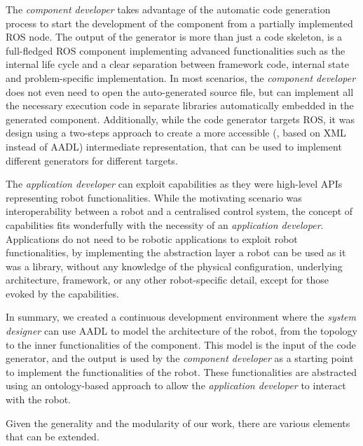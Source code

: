 The \textit{component developer} takes advantage of the automatic code generation process to start the development of the component from a partially implemented ROS node. The output of the generator is more than just a code skeleton, is a full-fledged ROS component implementing advanced functionalities such as the internal life cycle and a clear separation between framework code, internal state and problem-specific implementation. In most scenarios, the \textit{component developer} does not even need to open the auto-generated source file, but can implement all the necessary execution code in separate libraries automatically embedded in the generated component. Additionally, while the code generator targets ROS, it was design using a two-steps approach to create a more accessible (\ie, based on XML instead of AADL) intermediate representation, that can be used to implement different generators for different targets.

The \textit{application developer} can exploit capabilities as they were high-level APIs representing robot functionalities. While the motivating scenario was interoperability between a robot and a centralised control system, the concept of capabilities fits wonderfully with the necessity of an \textit{application developer}. Applications do not need to be robotic applications to exploit robot functionalities, by implementing the abstraction layer a robot can be used as it was a library, without any knowledge of the physical configuration, underlying architecture, framework, or any other robot-specific detail, except for those evoked by the capabilities. 

In summary, we created a continuous development environment where the \textit{system designer} can use AADL to model the architecture of the robot, from the topology to the inner functionalities of the component. This model is the input of the code generator, and the output is used by the \textit{component developer} as a starting point to implement the functionalities of the robot. These functionalities are abstracted using an ontology-based approach to allow the \textit{application developer} to interact with the robot.

Given the generality and the modularity of our work, there are various elements that can be extended. 
